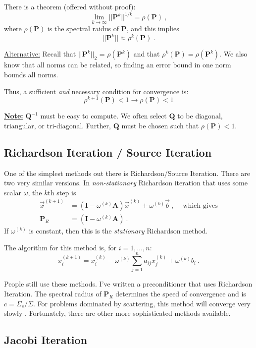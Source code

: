 \documentclass[12pt]{article}
\newcommand{\ve}[1]{\ensuremath{\mathbf{#1}}}
\begin{document}
There is a theorem (offered without proof):
\[\lim_{k \rightarrow \infty} || \ve{P}^k ||^{1/k} = \rho	(\ve{P})\:,\]
where $\rho(\ve{P})$ is the spectral raidus of $\ve{P}$, and this implies
\[|| \ve{P}^k || \approx \rho^k (\ve{P})\:.\]

\underline{Alternative:} Recall that $|| \ve{P}^k ||_2$ = $\rho(\ve{P}^k)$ and that $ \rho^k (\ve{P}) = \rho(\ve{P}^k)$. We also know that all norms can be related, so finding an error bound in one norm bounds all norms. 

Thus, a sufficient \textit{and} necessary condition for convergence is:
\[\rho^{k+1}(\ve{P}) < 1 \rightarrow \rho(\ve{P}) < 1 \]

\underline{\textbf{Note:}} $\ve{Q}^{-1}$ must be easy to compute. We often select $\ve{Q}$ to be diagonal, triangular, or tri-diagonal. Further, $\ve{Q}$ must be chosen such that $\rho(\ve{P}) < 1$.

\subsection*{Richardson Iteration / Source Iteration}

One of the simplest methods out there is Richardson/Source Iteration. There are two very similar versions. In \textit{non-stationary} Richardson iteration that uses some scalar $\omega$, the $k$th step is
%
\begin{align*}
  \vec{x}^{(k+1)} &= (\ve{I} - \omega^{(k)}\ve{A})\vec{x}^{(k)} + \omega^{(k)}\vec{b} \:, \quad\ \text{which gives} \\
  \ve{P}_R &= (\ve{I} - \omega^{(k)}\ve{A})\:.
\end{align*}
%
If $\omega^{(k)}$ is constant, then this is the \textit{stationary} Richardson method. 

The algorithm for this method is, for $i = 1, \dots, n$:
\[ x^{(k+1)}_i =  x^{(k)}_i - \omega^{(k)} \sum_{j=1}^{n} a_{ij}x_j^{(k)} + \omega^{(k)} b_i \:.\]

People still use these methods. I've written a preconditioner that uses Richardson Iteration. The spectral radius of $\ve{P}_R$ determines the speed of convergence and is $c = \Sigma_s / \Sigma$. For problems dominated by scattering, this method will converge very slowly \cite{Evans2009d}. Fortunately, there are other more sophisticated methods available. 

\subsection*{Jacobi Iteration}
\end{document}
